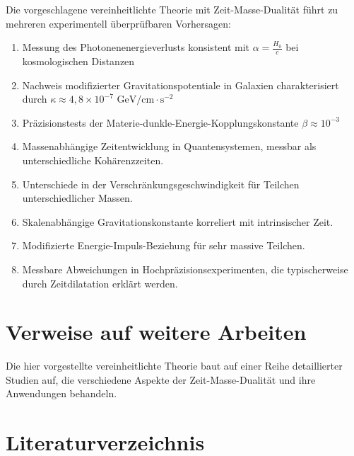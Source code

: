 \documentclass{article}
\begin{document}
	Die vorgeschlagene vereinheitlichte Theorie mit Zeit-Masse-Dualität führt zu mehreren experimentell überprüfbaren Vorhersagen:
	
	\begin{enumerate}
		\item Messung des Photonenenergieverlusts konsistent mit $\alpha = \frac{H_0}{c}$ bei kosmologischen Distanzen
		\item Nachweis modifizierter Gravitationspotentiale in Galaxien charakterisiert durch $\kappa \approx 4{,}8 \times 10^{-7} \text{ GeV/cm}\cdot\text{s}^{-2}$
		\item Präzisionstests der Materie-dunkle-Energie-Kopplungskonstante $\beta \approx 10^{-3}$
		\item Massenabhängige Zeitentwicklung in Quantensystemen, messbar als unterschiedliche Kohärenzzeiten.
		\item Unterschiede in der Verschränkungsgeschwindigkeit für Teilchen unterschiedlicher Massen.
		\item Skalenabhängige Gravitationskonstante korreliert mit intrinsischer Zeit.
		\item Modifizierte Energie-Impuls-Beziehung für sehr massive Teilchen.
		\item Messbare Abweichungen in Hochpräzisionsexperimenten, die typischerweise durch Zeitdilatation erklärt werden.
	\end{enumerate}
	
	\section{Verweise auf weitere Arbeiten}
	
	Die hier vorgestellte vereinheitlichte Theorie baut auf einer Reihe detaillierter Studien auf, die verschiedene Aspekte der Zeit-Masse-Dualität und ihre Anwendungen behandeln.
	
	\section{Literaturverzeichnis}
	
\end{document}
